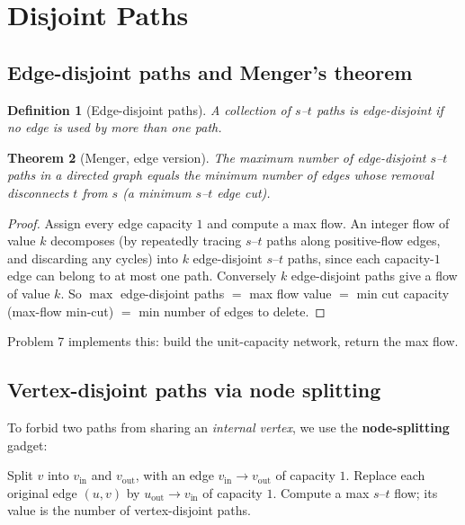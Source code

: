\documentclass[11pt]{article}
\newtheorem{theorem}{Theorem}[section]
\newtheorem{definition}[theorem]{Definition}
\begin{document}
\section{Disjoint Paths}

\subsection{Edge-disjoint paths and Menger's theorem}

\begin{definition}[Edge-disjoint paths]
A collection of $s$--$t$ paths is \emph{edge-disjoint} if no edge is used by more
than one path.
\end{definition}

\begin{theorem}[Menger, edge version]
\label{thm:menger-edge}
The maximum number of edge-disjoint $s$--$t$ paths in a directed graph equals the
minimum number of edges whose removal disconnects $t$ from $s$ (a minimum
$s$--$t$ edge cut).
\end{theorem}

\begin{proof}
Assign every edge capacity $1$ and compute a max flow. An integer flow of value
$k$ decomposes (by repeatedly tracing $s$--$t$ paths along positive-flow edges,
and discarding any cycles) into $k$ edge-disjoint $s$--$t$ paths, since each
capacity-$1$ edge can belong to at most one path. Conversely $k$ edge-disjoint
paths give a flow of value $k$. So $\max$ edge-disjoint paths $=$ max flow value
$=$ min cut capacity (max-flow min-cut) $=$ min number of edges to delete.
\end{proof}

Problem 7 implements this: build the unit-capacity network, return the max flow.

\subsection{Vertex-disjoint paths via node splitting}

To forbid two paths from sharing an \emph{internal vertex}, we use the
\textbf{node-splitting} gadget:

\begin{algorithm}[h]
\caption{Vertex-Disjoint Paths via Node Splitting}
\begin{algorithmic}[1]
    \State Split $v$ into $v_{\text{in}}$ and $v_{\text{out}}$, with an edge
    $v_{\text{in}} \to v_{\text{out}}$ of capacity $1$.
\EndFor
\State Replace each original edge $(u,v)$ by $u_{\text{out}} \to v_{\text{in}}$
of capacity $1$.
\State Compute a max $s$--$t$ flow; its value is the number of vertex-disjoint
paths.
\end{algorithmic}
\end{algorithm}
\end{document}

